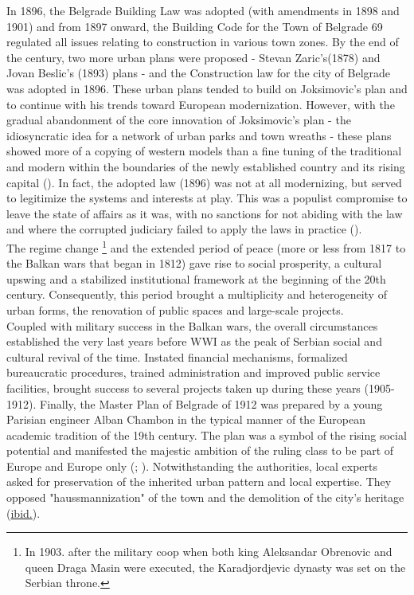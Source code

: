 \documentclass[11pt]{report}
\begin{document}
{{{{In 1896, the Belgrade Building Law was adopted (with amendments in 1898 and 1901) and from 1897 onward, the Building Code for the Town of Belgrade 69 regulated all issues relating to construction in various town zones.
By the end of the century, two more urban plans were proposed - Stevan Zaric’s(1878) and Jovan Beslic’s (1893) plans - and the Construction law for the city of Belgrade was adopted in 1896. These urban plans tended to build on Joksimovic’s plan and to continue with his trends toward European modernization.  However, with the gradual abandonment of the core innovation of Joksimovic’s plan - the idiosyncratic idea for a network of urban parks and town wreaths -	these plans showed more of a copying of western models than a fine tuning of the traditional and modern within the boundaries of the newly established country and its rising capital  (\href{Blagojevic}{\citealt{blagojevic_urban_2009}}). In fact, the adopted law (1896) was not at all modernizing, but served to legitimize the systems and interests at play.  This was a populist compromise to leave the state of affairs as it was, with no sanctions for not abiding with the law and where the corrupted judiciary failed to apply the laws in practice (\href{Stojanovic}{\citealt{stojanovic_kontroverze_2015}}). 
\\

The regime change
\footnote{In 1903. after the military coop when both king Aleksandar Obrenovic and queen Draga Masin were executed, the Karadjordjevic dynasty was set on the Serbian throne.}
and the extended period of peace (more or less from 1817  to the Balkan wars that began in 1812)  gave rise to social prosperity, a cultural upswing and a stabilized institutional framework at the beginning of the 20th century.   Consequently, this period brought a multiplicity and heterogeneity of urban forms, the renovation of public spaces and large-scale projects.
\\

Coupled with military success in the Balkan wars, the overall circumstances established the very  last  years  before  WWI  as the  peak  of  Serbian  social  and  cultural  revival  of  the  time. Instated  financial   mechanisms,   formalized  bureaucratic  procedures,   trained  administration  and  improved  public  service  facilities,  brought  success  to  several  projects  taken  up during  these  years  (1905-1912).
Finally,  the  Master  Plan  of  Belgrade of 1912  was  prepared  by  a  young  Parisian  engineer  Alban  Chambon  in  the  typical  manner of  the  European  academic  tradition  of  the  19th  century.   The  plan  was  a  symbol  of  the rising social potential and manifested the majestic ambition of the ruling class to be part  of  Europe  and  Europe  only   
(\href{Blagojevic}{\citealt{blagojevic_urban_2009}}; \href{Doytchinov}{\citealt{doytchinov_modernization_2015}}).
Notwithstanding the authorities, local experts asked for preservation of the inherited urban pattern and local expertise. They opposed "haussmannization" of the town and the demolition of the city's heritage (\href{ref}{ibid.}).
\\

}}}}
\end{document}

